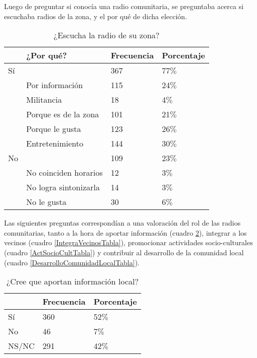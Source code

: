 \indent Luego de preguntar si conocía una radio comunitaria, se preguntaba acerca si escuchaba radios de la zona, y el por qué de dicha elección.
\begin{table}[ht]
	\centering
{}
		\begin{tabular}{|l|l|l|l|}\hline
	\textbf{}&\textbf{¿Por qué?}&\textbf{Frecuencia}&\textbf{Porcentaje}\\\hline\hline
			Sí	&&	367&	77$\%$\\\hline
				&Por información&	115&	24$\%$\\\hline
				&Militancia&	18&	4$\%$\\\hline
				&Porque es de la zona&	101&	21$\%$\\\hline
				&Porque le gusta&	123&	26$\%$\\\hline
				&Entretenimiento&	144&	30$\%$\\\hline\hline
			No	&&	109&	23$\%$\\\hline
				&No coinciden horarios&	12&	3$\%$\\\hline
				&No logra sintonizarla&	14&	3$\%$\\\hline
				&No le gusta&	30&	6$\%$\\\hline
		\end{tabular}
	  \caption{¿Escucha la radio de su zona?}
	  \label{LaEscuchaTabla}
\end{table}

\newpage

\newpage

\indent Las siguientes preguntas correspondían a una valoración del rol de las radios comunitarias, tanto a la hora de aportar información (cuadro \ref{InfoLocalTabla}), integrar a los vecinos (cuadro \ref{IntegraVecinosTabla}), promocionar actividades socio-culturales (cuadro \ref{ActSocioCultTabla}) y contribuir al desarrollo de la comunidad local (cuadro \ref{DesarrolloComunidadLocalTabla}).\\
\begin{table}[ht]
	\centering
{}
		\begin{tabular}{|l|l|l|}\hline
	\textbf{}&\textbf{Frecuencia}&\textbf{Porcentaje}\\\hline\hline
			Sí	&	360&	52$\%$\\\hline
			No	&	46&	7$\%$\\\hline
			NS/NC	&	291&	42$\%$\\\hline
		\end{tabular}
	  \caption{¿Cree que aportan información local?}
	  \label{InfoLocalTabla}
\end{table}


